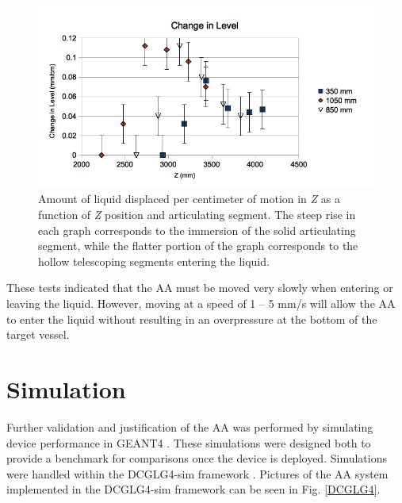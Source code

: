 \begin{figure}
\includegraphics[width=\textwidth]{AA/Differential_Displacement.jpg}
\caption{Amount of liquid displaced per centimeter of motion in \emph{Z} as a function of \emph{Z} position and articulating segment. The steep rise in each graph corresponds to the immersion of the solid articulating segment, while the flatter portion of the graph corresponds to the hollow telescoping segments entering the liquid.}
\label{Delta_Submerged}
\end{figure}


These tests indicated that the AA must be moved very slowly when entering or leaving the liquid. However, moving at a speed of 1 -- 5 \hbox{\rm mm/s} will allow the AA to enter the liquid without resulting in an overpressure at the bottom of the target vessel. 



\label{Articulation Tests}

\section{Simulation}
	Further validation and justification of the AA was performed by simulating device performance in GEANT4 \cite{G4}. These simulations were designed both to provide a benchmark for comparisons once the device is deployed. Simulations were handled within the DCGLG4-sim framework \cite{DCGLG4sim}. Pictures of the AA system implemented in the DCGLG4-sim framework can be seen in Fig. \ref{DCGLG4}. 
	
